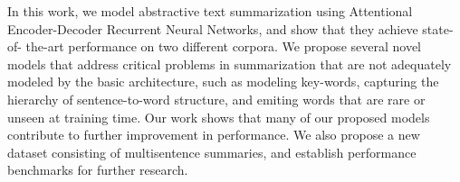 In this work, we model abstractive text summarization using Attentional Encoder-Decoder Recurrent Neural Networks, and show that they achieve state-of- the-art performance on two different corpora. We propose several novel models that address critical problems in summarization that are not adequately modeled by the basic architecture, such as modeling key-words, capturing the hierarchy of sentence-to-word structure, and emiting words that are rare or unseen at training time. Our work shows that many of our proposed models contribute to further improvement in performance. We also propose a new dataset consisting of multisentence summaries, and establish performance benchmarks for further research.
